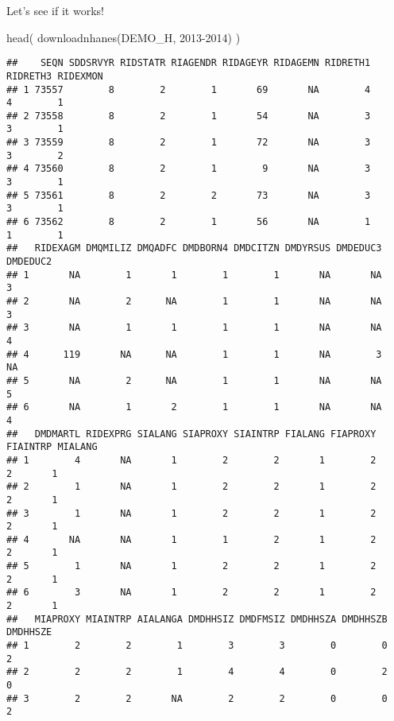 \documentclass[
]{book}
\newenvironment{Shaded}{\begin{snugshade}}{\end{snugshade}}
\newcommand{\FunctionTok}[1]{\textcolor[rgb]{0.00,0.00,0.00}{#1}}
\newcommand{\NormalTok}[1]{#1}
\newcommand{\StringTok}[1]{\textcolor[rgb]{0.31,0.60,0.02}{#1}}
\begin{document}
Let's see if it works!

\begin{Shaded}
\begin{Highlighting}[]
\FunctionTok{head}\NormalTok{(}
    \FunctionTok{downloadnhanes}\NormalTok{(}\StringTok{\textquotesingle{}DEMO\_H\textquotesingle{}}\NormalTok{, }\StringTok{\textquotesingle{}2013{-}2014\textquotesingle{}}\NormalTok{)}
\NormalTok{    )}
\end{Highlighting}
\end{Shaded}

\begin{verbatim}
##    SEQN SDDSRVYR RIDSTATR RIAGENDR RIDAGEYR RIDAGEMN RIDRETH1 RIDRETH3 RIDEXMON
## 1 73557        8        2        1       69       NA        4        4        1
## 2 73558        8        2        1       54       NA        3        3        1
## 3 73559        8        2        1       72       NA        3        3        2
## 4 73560        8        2        1        9       NA        3        3        1
## 5 73561        8        2        2       73       NA        3        3        1
## 6 73562        8        2        1       56       NA        1        1        1
##   RIDEXAGM DMQMILIZ DMQADFC DMDBORN4 DMDCITZN DMDYRSUS DMDEDUC3 DMDEDUC2
## 1       NA        1       1        1        1       NA       NA        3
## 2       NA        2      NA        1        1       NA       NA        3
## 3       NA        1       1        1        1       NA       NA        4
## 4      119       NA      NA        1        1       NA        3       NA
## 5       NA        2      NA        1        1       NA       NA        5
## 6       NA        1       2        1        1       NA       NA        4
##   DMDMARTL RIDEXPRG SIALANG SIAPROXY SIAINTRP FIALANG FIAPROXY FIAINTRP MIALANG
## 1        4       NA       1        2        2       1        2        2       1
## 2        1       NA       1        2        2       1        2        2       1
## 3        1       NA       1        2        2       1        2        2       1
## 4       NA       NA       1        1        2       1        2        2       1
## 5        1       NA       1        2        2       1        2        2       1
## 6        3       NA       1        2        2       1        2        2       1
##   MIAPROXY MIAINTRP AIALANGA DMDHHSIZ DMDFMSIZ DMDHHSZA DMDHHSZB DMDHHSZE
## 1        2        2        1        3        3        0        0        2
## 2        2        2        1        4        4        0        2        0
## 3        2        2       NA        2        2        0        0        2

\end{verbatim}
\end{document}
